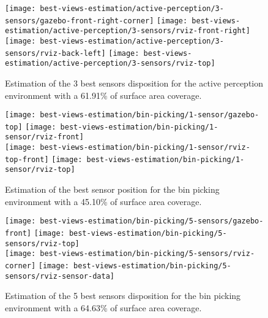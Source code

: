 \begin{figure}
	\centering
	\texttt{[image: best-views-estimation/active-perception/3-sensors/gazebo-front-right-corner]}\hspace{4em}
	\texttt{[image: best-views-estimation/active-perception/3-sensors/rviz-front-right]}\\
	\texttt{[image: best-views-estimation/active-perception/3-sensors/rviz-back-left]}\hspace{2em}
	\texttt{[image: best-views-estimation/active-perception/3-sensors/rviz-top]}
	\caption{Estimation of the 3 best sensors disposition for the active perception environment with a 61.91\% of surface area coverage.}
	\label{fig:active-perception-3-sensors}
\end{figure}

\begin{figure}
	\centering
	\texttt{[image: best-views-estimation/bin-picking/1-sensor/gazebo-top]}\hspace{2em}
	\texttt{[image: best-views-estimation/bin-picking/1-sensor/rviz-front]}\\
	\texttt{[image: best-views-estimation/bin-picking/1-sensor/rviz-top-front]}\hspace{2em}
	\texttt{[image: best-views-estimation/bin-picking/1-sensor/rviz-top]}
	\caption{Estimation of the best sensor position for the bin picking environment with a 45.10\% of surface area coverage.}
	\label{fig:bin-picking-1-sensor}
\end{figure}

\begin{figure}
	\centering
	\texttt{[image: best-views-estimation/bin-picking/5-sensors/gazebo-front]}\hspace{2em}
	\texttt{[image: best-views-estimation/bin-picking/5-sensors/rviz-top]}\\
	\texttt{[image: best-views-estimation/bin-picking/5-sensors/rviz-corner]}\hspace{2em}
	\texttt{[image: best-views-estimation/bin-picking/5-sensors/rviz-sensor-data]}
	\caption{Estimation of the 5 best sensors disposition for the bin picking environment with a 64.63\% of surface area coverage.}
	\label{fig:bin-picking-5-sensors}
\end{figure}

